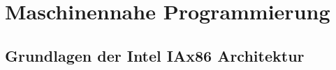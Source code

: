 \documentclass[11pt, a4paper, oneside, draft]{book}
\begin{document}
\part{Maschinennahe Programmierung}




\chapter{Grundlagen der Intel IAx86 Architektur}

\renewcommand{\indexname}{Stichwortverzeichnis}		%
\printindex
\end{document}
